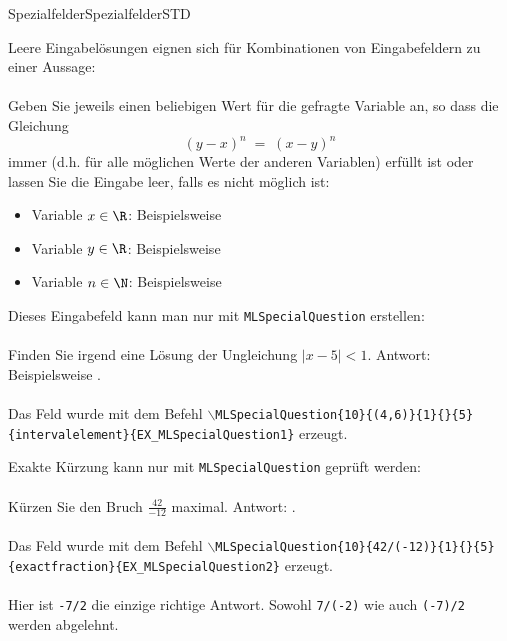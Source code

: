 \begin{MXContent}{Spezialfelder}{Spezialfelder}{STD}
\begin{MExample}
Leere Eingabelösungen eignen sich für Kombinationen von Eingabefeldern zu einer Aussage:
\ \\ \ \\
Geben Sie jeweils einen beliebigen Wert für die gefragte Variable an, so dass die Gleichung
$$
(y-x)^n\;=\; (x-y)^n
$$
immer (d.h. für alle möglichen Werte der anderen Variablen) erfüllt ist oder lassen Sie die Eingabe leer, falls es nicht möglich ist:
\begin{MQuestionGroup}
\begin{itemize}
\item{Variable $x\in\R$: Beispielsweise }
\item{Variable $y\in\R$: Beispielsweise }
\item{Variable $n\in\N$: Beispielsweise }
\end{itemize}
\end{MQuestionGroup}
\end{MExample}

\begin{MExample}
Dieses Eingabefeld kann man nur mit \texttt{MLSpecialQuestion} erstellen:
\ \\ \ \\
Finden Sie irgend eine Lösung der Ungleichung $|x-5|<1$. Antwort: Beispielsweise .
\ \\ \ \\
Das Feld wurde mit dem Befehl \texttt{$\backslash$MLSpecialQuestion\{10\}\{(4,6)\}\{1\}\{\}\{5\}\{intervalelement\}\{EX\_MLSpecialQuestion1\}} erzeugt.
\end{MExample}

\begin{MExample}
Exakte Kürzung kann nur mit \texttt{MLSpecialQuestion} geprüft werden:
\ \\ \ \\
Kürzen Sie den Bruch $\frac{42}{-12}$ maximal. Antwort: .
\ \\ \ \\
Das Feld wurde mit dem Befehl \texttt{$\backslash$MLSpecialQuestion\{10\}\{42/(-12)\}\{1\}\{\}\{5\}\{exactfraction\}\{EX\_MLSpecialQuestion2\}} erzeugt.
\ \\ \ \\
Hier ist \texttt{-7/2} die einzige richtige Antwort. Sowohl \texttt{7/(-2)} wie auch \texttt{(-7)/2} werden abgelehnt.
\end{MExample}


\end{MXContent}
